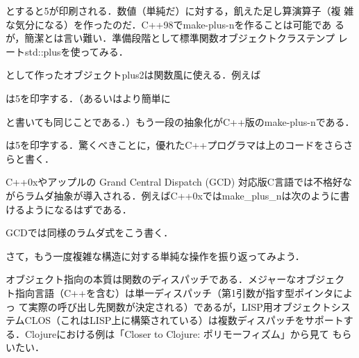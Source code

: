 \documentclass[a5paper,twoside,fleqn,draft]{jsbook}
\begin{document}
とすると5が印刷される．数値（単純だ）に対する，飢えた足し算演算子（複
  雑な気分になる）を作ったのだ．C++98でmake-plus-nを作ることは可能であ
るが，簡潔とは言い難い．準備段階として標準関数オブジェクトクラステンプ
レートstd::plusを使ってみる．


として作ったオブジェクトplus2は関数風に使える．例えば


は5を印字する．（あるいはより簡単に


と書いても同じことである．）もう一段の抽象化がC++版のmake-plus-nである．


は5を印字する．驚くべきことに，優れたC++プログラマは上のコードをさらさ
らと書く．

C++0xやアップルの Grand Central Dispatch (GCD) 対応版C言語では不格好な
がらラムダ抽象が導入される．例えばC++0xではmake\_plus\_nは次のように書
けるようになるはずである．


GCDでは同様のラムダ式をこう書く．


さて，もう一度複雑な構造に対する単純な操作を振り返ってみよう．

オブジェクト指向の本質は関数のディスパッチである．メジャーなオブジェク
ト指向言語（C++を含む）は単一ディスパッチ（第1引数が指す型ポインタによっ
て実際の呼び出し先関数が決定される）であるが，LISP用オブジェクトシス
テムCLOS（これはLISP上に構築されている）は複数ディスパッチをサポートす
る．Clojureにおける例は「Closer to Clojure: ポリモーフィズム」から見て
もらいたい．
\end{document}
